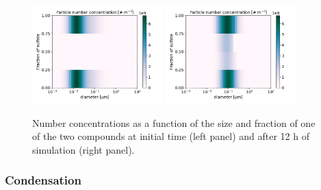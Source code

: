 \documentclass[a4paper,11pt]{article}
\begin{document}
\begin{figure}[H]
        \begin{center}
                \includegraphics[angle=0,width=0.45\textwidth]{../graph/figure_ref/coag_ext_init.png}
                \includegraphics[angle=0,width=0.45\textwidth]{../graph/figure_ref/coag_ext_out.png}
        \end{center}
\caption{Number concentrations as a function of the size and fraction of one of the
two compounds at initial time (left panel) and after 12 h of simulation (right panel).}
\label{fig-coag-extb}
\end{figure}
 
\subsubsection{Condensation}
\end{document}

